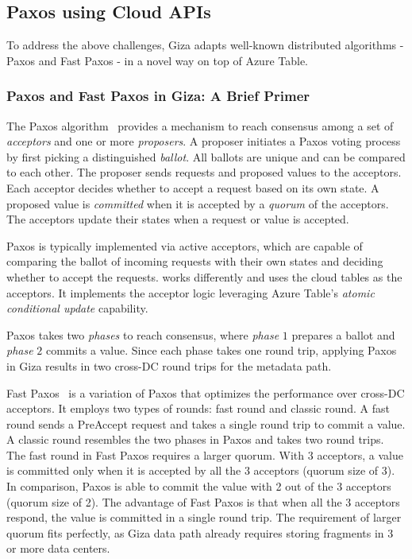 \subsection{Paxos using Cloud APIs}

To address the above challenges, Giza adapts well-known distributed algorithms
- Paxos and Fast Paxos - in a novel way on top of Azure Table.

\subsubsection{Paxos and Fast Paxos in Giza: A Brief Primer}

The Paxos algorithm~\cite{lamport01paxos} provides a mechanism to reach
consensus among a set of {\em acceptors} and one or more {\em proposers}.
A proposer initiates a Paxos voting process by first picking a distinguished {\em
  ballot}. All ballots are unique and can be compared to each other. The
proposer sends requests and proposed values to the acceptors.
Each acceptor decides whether to accept a request based on its
own state. A proposed value is {\em committed} when it is accepted by a {\em
  quorum} of the acceptors. The acceptors update their states when a request or
value is accepted.

Paxos is typically implemented via active acceptors, which are
capable of comparing the ballot of incoming requests with their own states and
deciding whether to accept the requests.
\name works differently and uses the cloud tables as the acceptors.
It implements the acceptor logic leveraging Azure Table's {\em atomic conditional update} capability.

Paxos takes two {\em phases} to reach consensus, where {\em phase} $1$ prepares
a ballot and {\em phase} $2$ commits a value. Since each phase takes one round
trip, applying Paxos in Giza results in two cross-DC round trips for the metadata path.


Fast Paxos~\cite{lamport05fast} is a variation of Paxos that optimizes the
performance over cross-DC acceptors. It employs two types of rounds: fast round
and classic round. A fast round sends a PreAccept request and takes a single
round trip to commit a value. A classic round resembles the two phases in Paxos
and takes two round trips. The fast round in Fast Paxos requires a larger quorum.
With $3$ acceptors,
a value is committed only when it is accepted by all the 3 acceptors (quorum size of 3).
In comparison, Paxos is able to commit the value with 2 out of the 3 acceptors (quorum size of 2).
The advantage of Fast Paxos is that when all the 3 acceptors respond, the value is committed
in a single round trip. The requirement of larger quorum fits \name perfectly,
as Giza data path already requires storing fragments in 3 or more data centers.

